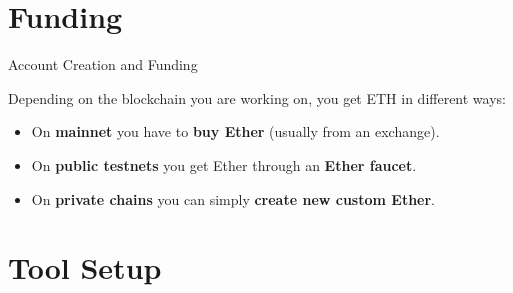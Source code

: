 \documentclass[]{beamer}
\begin{document}


\section{Funding}

\begin{frame}{Account Creation and Funding}
	
	Depending on the blockchain you are working on, you get ETH in different ways:\\
	
	\begin{itemize}
		\item<1-> On \textbf{mainnet} you have to \textbf{buy Ether}	 (usually from an exchange).
		\item<2-> On \textbf{public testnets} you get Ether through an \textbf{Ether faucet}.
		\item<3-> On \textbf{private chains} you can simply \textbf{create new custom Ether}.
	\end{itemize}
	\vspace{1em}
\end{frame}


\section{Tool Setup}
\end{document}
